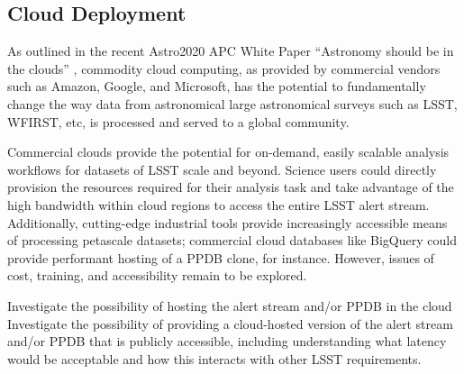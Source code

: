 \subsection{Cloud Deployment}

As outlined in the  recent Astro2020 APC White Paper ``Astronomy should be in the clouds'' \cite{Smith:2019gqn}, commodity cloud computing, as provided by commercial vendors such as Amazon, Google, and Microsoft, has the potential to fundamentally change the way data from astronomical large astronomical surveys such as LSST, WFIRST, etc, is processed and served to a global community. 

Commercial clouds provide the potential for on-demand, easily scalable analysis workflows for datasets of LSST scale and beyond.  
Science users could directly provision the resources required for their analysis task and take advantage of the high bandwidth within cloud regions to access the entire LSST alert stream.  
Additionally, cutting-edge industrial tools provide increasingly accessible means of processing petascale datasets;
commercial cloud databases like BigQuery could provide performant hosting of a PPDB clone, for instance.
However, issues of cost, training, and accessibility remain to be explored.

{Investigate the possibility of hosting the alert stream and/or PPDB in the cloud}
{Investigate the possibility of providing a cloud-hosted version of the alert stream and/or PPDB that is publicly accessible, including understanding what latency would be acceptable and how  this interacts with other LSST requirements.}